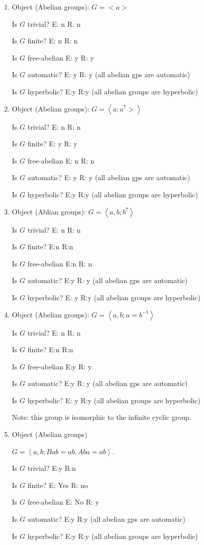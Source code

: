 \documentclass{article}
\begin{document}
\begin{enumerate}

\item Object (Abelian groups): $G=<a>$

Is $G$ trivial? E: n  R: n

Is $G$ finite? E: n R: n

Is $G$ free-abelian E: y R: y

Is $G$ automatic? E: y R: y (all abelian gps are automatic)

Is $G$ hyperbolic? E:y R:y (all abelian groups are hyperbolic) 

\item Object (Abelian groups): $G=\left<a;a^7>\right>$

Is $G$ trivial? E: n R: n

Is $G$ finite? E: y R: y

Is $G$ free-abelian E: n R: n

Is $G$ automatic? E: y R: y (all abelian gps are automatic)

Is $G$ hyperbolic? E:y R:y (all abelian groups are hyperbolic)

\item Object (Ablian groups): $G=\left<a,b; b^7 \right>$ 

Is $G$ trivial? E: n R: n

Is $G$ finite? E:n R:n 

Is $G$ free-abelian E:n  R: n

Is $G$ automatic? E:y  R: y (all abelian gps are automatic)

Is $G$ hyperbolic? E: y R:y (all abelian groups are hyperbolic)

\item Object (Abelian groups): $G=\left<a,b; a=b^{-1} \right>$

Is $G$ trivial? E: n R: n

Is $G$ finite? E:n R:n 

Is $G$ free-abelian E:y  R: y

Is $G$ automatic? E:y  R: y (all abelian gps are automatic)

Is $G$ hyperbolic? E: y R:y (all abelian groups are hyperbolic)

Note: this group is isomorphic to the infinite cyclic group.

\item Object (Abelian groups)

$G=\left<a,b; Bab=ab, Aba=ab \right>$.


Is $G$ trivial? E:y  R:n 

Is $G$ finite? E: Yes R: no 

Is $G$ free-abelian E: No R: y

Is $G$ automatic? E:y R:y  (all abelian gps are automatic)

Is $G$ hyperbolic? E:y  R:y (all abelian groups are hyperbolic)

\end{enumerate}
\end{document}
